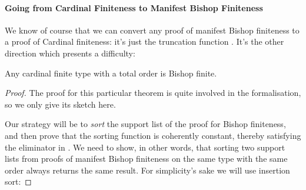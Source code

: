 \paragraph{Going from Cardinal Finiteness to Manifest Bishop Finiteness}
We know of course that we can convert any proof of manifest Bishop finiteness to
a proof of Cardinal finiteness: it's just the truncation function
\AgdaInductiveConstructor{\(\lvert \_ \rvert\)}.
It's the other direction which presents a difficulty:
\begin{theorem}\label{cardinal-to-manifest-bishop}
  Any cardinal finite type with a total order is Bishop finite.
\end{theorem}
\begin{proof}
The proof for this particular theorem is quite involved in the formalisation, so
we only give its sketch here.

Our strategy will be to \emph{sort} the support list of the proof for Bishop
finiteness, and then prove that the sorting function is coherently constant,
thereby satisfying the eliminator in .
We need to show, in other words, that sorting two support lists from proofs of
manifest Bishop finiteness on the same type with the same order always returns
the same result.
For simplicity's sake we will use insertion sort:


\end{proof}
